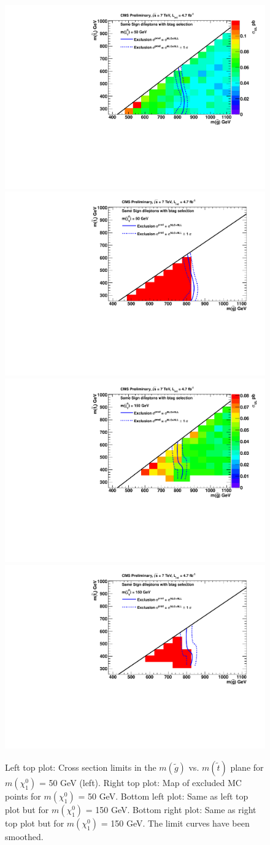 \begin{figure}[htb]
\begin{center}
\includegraphics[width=0.49\linewidth]{figs/GlStop_50_LimitsOnCarpet.pdf}
\includegraphics[width=0.49\linewidth]{figs/GlStop_50_ExcludedRegionMap.pdf}
\includegraphics[width=0.49\linewidth]{figs/GlStop_150_LimitsOnCarpet.pdf}
\includegraphics[width=0.49\linewidth]{figs/GlStop_150_ExcludedRegionMap.pdf}
\caption{Left top plot: Cross section limits in the $m(\widetilde{g})$ 
vs. $m(\widetilde{t})$ plane
for $m(\chi_1^0)$ = 50 GeV (left).
Right top plot: Map of excluded MC points for 
$m(\chi_1^0)$ = 50 GeV.
Bottom left plot: Same as left top plot but for $m(\chi_1^0)$ = 150 GeV.
Bottom right plot: Same as right top plot but for $m(\chi_1^0)$ = 150 GeV.
The limit curves have been smoothed. 
\label{fig:mglinoStop}}
\end{center}
\end{figure}

